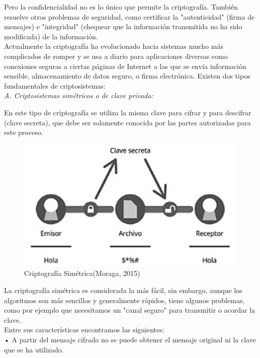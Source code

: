 \documentclass[9pt,24pt,twocolumn]{article}
\begin{document}
{Pero la confidencialidad no es lo único que permite la criptografía. También resuelve otros problemas de seguridad, como certificar la "autenticidad" (firma de mensajes) e "integridad" (chequear que la información transmitida no ha sido modificada) de la información.}
\\

{Actualmente la criptografía ha evolucionado hacia sistemas mucho más complicados de romper y se usa a diario para aplicaciones diversas como conexiones seguras a ciertas páginas de Internet a las que se envía información sensible, almacenamiento de datos seguro, o firma electrónica. Existen dos tipos fundamentales de criptosistemas:}
\\

\textit{A.  Criptosistemas simétricos o de clave privada:}

{En este tipo de criptografía se utiliza la misma clave para cifrar y para descifrar (clave secreta), que debe ser solamente conocida por las partes autorizadas para este proceso.}
\\

\begin{figure}[h]
  \centering
    \includegraphics{simetrico1}
  \caption{Criptografía Simétrica(Moraga, 2015)}
  \label{fig:sim}
\end{figure}


{La criptografía simétrica es considerada la más fácil, sin embargo, aunque los algoritmos son más sencillos y generalmente rápidos, tiene algunos problemas, como por ejemplo que necesitamos un "canal seguro" para transmitir o acordar la clave.}
\\

{Entre sus características encontramos las siguientes:}
\\

{• A partir del mensaje cifrado no se puede obtener el mensaje original ni la clave que se ha utilizado.}
\\
\end{document}
